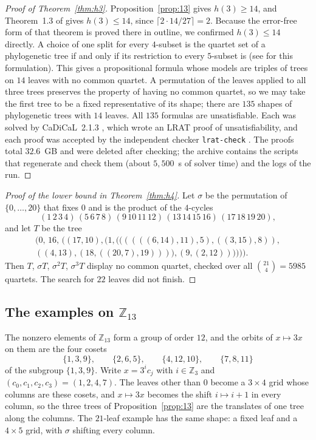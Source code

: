 \documentclass[11pt]{amsart}
\theoremstyle{definition}
\begin{document}
\begin{proof}[Proof of Theorem~\ref{thm:h3}]
Proposition~\ref{prop:13} gives $h(3)\ge14$, and Theorem~1.3 of \cite{SY} gives $h(3)\le14$, since
$\lceil 2\cdot14/27\rceil=2$. Because the error-free form of that theorem is proved there in outline, we confirmed
$h(3)\le14$ directly. A choice of one split for every $4$-subset is the quartet set of a phylogenetic tree if and
only if its restriction to every $5$-subset is \cite{CS} (see \cite{HMSW} for this formulation). This gives a
propositional formula whose models are triples of trees on $14$ leaves with no common quartet. A permutation of the
leaves applied to all three trees preserves the property of having no common quartet, so we may take the first tree
to be a fixed representative of its shape; there are $135$ shapes of phylogenetic trees with $14$ leaves. All $135$
formulas are unsatisfiable. Each was solved by CaDiCaL~2.1.3 \cite{cadical}, which wrote an LRAT proof of
unsatisfiability, and each proof was accepted by the independent checker \texttt{lrat-check} \cite{lrat}. The
proofs total $32.6$~GB and were deleted after checking; the archive contains the scripts that regenerate and check
them (about $5{,}500$~s of solver time) and the logs of the run.
\end{proof}

\begin{proof}[Proof of the lower bound in Theorem~\ref{thm:h4}]
Let $\sigma$ be the permutation of $\{0,\dots,20\}$ that fixes $0$ and is the product of the $4$-cycles
\[
(1\,2\,3\,4)\,(5\,6\,7\,8)\,(9\,10\,11\,12)\,(13\,14\,15\,16)\,(17\,18\,19\,20),
\]
and let $T$ be the tree
\[
\begin{gathered}
(0,\,16,\,((17,10),(1,((((((6,14),11),5),((3,15),8)),\\
((4,13),(18,((20,7),19)))),(9,(2,12)))))).
\end{gathered}
\]
Then $T$, $\sigma T$, $\sigma^2T$, $\sigma^3T$ display no common quartet, checked over all $\binom{21}{4}=5985$
quartets. The search for $22$ leaves did not finish.
\end{proof}

\subsection{\texorpdfstring{The examples on $\mathbb{Z}_{13}$}{The examples on Z13}}\label{sec:z13}

The nonzero elements of $\mathbb{Z}_{13}$ form a group of order $12$, and the orbits of $x\mapsto3x$ on them are the
four cosets
\[
\{1,3,9\},\qquad\{2,6,5\},\qquad\{4,12,10\},\qquad\{7,8,11\}
\]
of the subgroup $\{1,3,9\}$. Write $x=3^ic_j$ with $i\in\mathbb{Z}_3$ and $(c_0,c_1,c_2,c_3)=(1,2,4,7)$. The leaves
other than $0$ become a $3\times4$ grid whose columns are these cosets, and $x\mapsto3x$ becomes the shift
$i\mapsto i+1$ in every column, so the three trees of Proposition~\ref{prop:13} are the translates of one tree along
the columns. The $21$-leaf example has the same shape: a fixed leaf and a $4\times5$ grid, with $\sigma$ shifting
every column.
\end{document}
